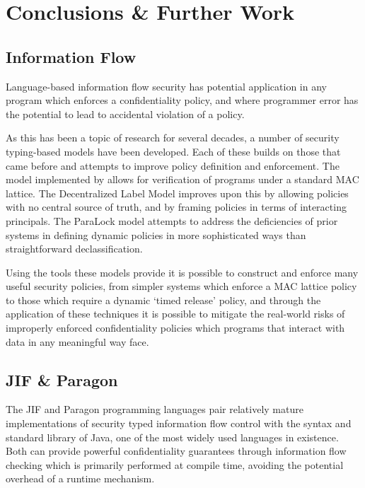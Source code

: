 \chapter{Conclusions \& Further Work}

\section{Information Flow}

Language-based information flow security has potential application in any program which enforces a confidentiality policy, and where programmer error has the potential to lead to accidental violation of a policy.

As this has been a topic of research for several decades, a number of security typing-based models have been developed. Each of these builds on those that came before and attempts to improve policy definition and enforcement. The model implemented by \citeauthor{denning1977certification} \cite{denning1977certification} allows for verification of programs under a standard MAC lattice. The Decentralized Label Model improves upon this by allowing policies with no central source of truth, and by framing policies in terms of interacting principals. The ParaLock model \cite{broberg2010paralocks} attempts to address the deficiencies of prior systems in defining dynamic policies in more sophisticated ways than straightforward declassification.

Using the tools these models provide it is possible to construct and enforce many useful security policies, from simpler systems which enforce a MAC lattice policy to those which require a dynamic `timed release' policy, and through the application of these techniques it is possible to mitigate the real-world risks of improperly enforced confidentiality policies which programs that interact with data in any meaningful way face.

\section{JIF \& Paragon}

The JIF and Paragon programming languages pair relatively mature implementations of security typed information flow control with the syntax and standard library of Java, one of the most widely used languages in existence. Both can provide powerful confidentiality guarantees through information flow checking which is primarily performed at compile time, avoiding the potential overhead of a runtime mechanism.

